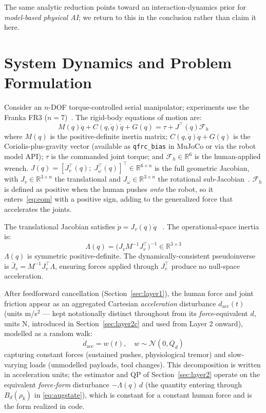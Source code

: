 \documentclass[journal]{IEEEtran}
\newcommand{\Jvb}{\bar{J}_v}
\begin{document}
The same analytic reduction points toward an interaction-dynamics prior for
\emph{model-based physical AI}; we return to this in the conclusion rather than
claim it here.

\section{System Dynamics and Problem Formulation}

Consider an $n$-DOF torque-controlled serial manipulator; experiments
use the Franka FR3 ($n=7$)~\cite{franka2023fr3}.
The rigid-body equations of motion are:
\begin{equation}\label{eq:eom}
  M(q)\ddot{q}+C(q,\dot{q})\dot{q}+G(q)=\tau+J^\top(q)\mathcal{F}_h
\end{equation}
where $M(q)$ is the positive-definite inertia matrix;
$C(q,\dot{q})\dot{q}+G(q)$ is the Coriolis-plus-gravity vector
(available as \texttt{qfrc\_bias} in MuJoCo or via the robot model API);
$\tau$ is the commanded joint torque; and $\mathcal{F}_h\in\mathbb{R}^6$
is the human-applied wrench.
$J(q)=[J_v^\top(q);\;J_\omega^\top(q)]^\top\in\mathbb{R}^{6\times n}$
is the full geometric Jacobian, with $J_v\in\mathbb{R}^{3\times n}$ the
translational and $J_\omega\in\mathbb{R}^{3\times n}$ the rotational
sub-Jacobian~\cite{siciliano2009robotics}.
$\mathcal{F}_h$ is defined as positive when the human pushes
\emph{onto} the robot, so it enters~\eqref{eq:eom} with a positive
sign, adding to the generalized force that accelerates the joints.

The translational Jacobian satisfies $\dot{p}=J_v(q)\dot{q}$~%
\cite{siciliano2009robotics}.
The operational-space inertia~\cite{khatib1987unified} is:
\begin{equation}\label{eq:Lambda}
  \Lambda(q)=\bigl(J_vM^{-1}J_v^\top\bigr)^{-1}\in\mathbb{R}^{3\times3}
\end{equation}
$\Lambda(q)$ is symmetric positive-definite.
The dynamically-consistent
pseudoinverse~\cite{khatib1987unified,sentis2005synthesis} is
$\Jvb=M^{-1}J_v^\top\Lambda$, ensuring forces applied through
$J_v^\top$ produce no null-space acceleration.

After feedforward cancellation (Section~\ref{sec:layer1}), the human
force and joint friction appear as an aggregated Cartesian
\emph{acceleration} disturbance $d_{\text{acc}}(t)$ (units m/s$^2$ ---
kept notationally distinct throughout from its \emph{force}-equivalent
$d$, units N, introduced in Section~\ref{sec:layer2c} and used from Layer
2 onward), modelled as a random walk:
\begin{equation}\label{eq:distmodel}
  \dot{d}_{\text{acc}}=w(t),\quad w\sim\mathcal{N}(0,Q_d)
\end{equation}
capturing constant forces (sustained pushes, physiological tremor) and
slow-varying loads (unmodelled payloads, tool changes).
This decomposition is written in acceleration units; the estimator and QP of
Section~\ref{sec:layer2} operate on the equivalent \emph{force-form}
disturbance $-\Lambda(q)\,d$ (the quantity entering through $B_d(\rho_k)$ in
\eqref{eq:augstate}), which is constant for a constant human force and is the
form realized in code.
\end{document}
